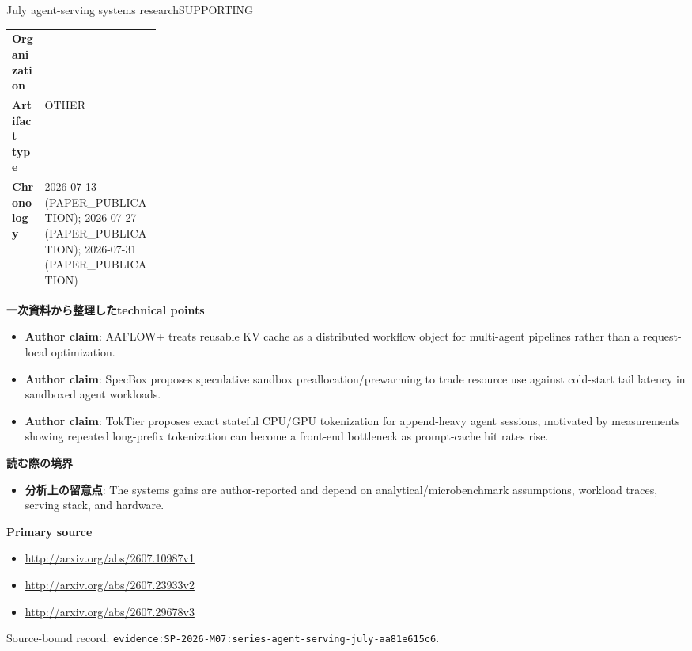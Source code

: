 \begin{technicalnote}{July agent-serving systems research}{SUPPORTING}
\begin{tabularx}{\linewidth}{@{}>{\bfseries}p{0.22\linewidth}X@{}}
Organization & - \\
Artifact type & OTHER \\
Chronology & 2026-07-13 (PAPER\_PUBLICATION); 2026-07-27 (PAPER\_PUBLICATION); 2026-07-31 (PAPER\_PUBLICATION) \\
\end{tabularx}
\smallskip
{\bfseries 一次資料から整理したtechnical points}
\begin{itemize}[leftmargin=1.5em,itemsep=0.35em]
\item \textbf{Author claim}: AAFLOW+ treats reusable KV cache as a distributed workflow object for multi-agent pipelines rather than a request-local optimization.
\item \textbf{Author claim}: SpecBox proposes speculative sandbox preallocation/prewarming to trade resource use against cold-start tail latency in sandboxed agent workloads.
\item \textbf{Author claim}: TokTier proposes exact stateful CPU/GPU tokenization for append-heavy agent sessions, motivated by measurements showing repeated long-prefix tokenization can become a front-end bottleneck as prompt-cache hit rates rise.
\end{itemize}
{\bfseries 読む際の境界}
\begin{itemize}[leftmargin=1.5em,itemsep=0.35em]
\item \textbf{分析上の留意点}: The systems gains are author-reported and depend on analytical/microbenchmark assumptions, workload traces, serving stack, and hardware.
\end{itemize}
{\bfseries Primary source}
\begin{itemize}[leftmargin=1.5em,itemsep=0.25em]
\item \url{http://arxiv.org/abs/2607.10987v1}
\item \url{http://arxiv.org/abs/2607.23933v2}
\item \url{http://arxiv.org/abs/2607.29678v3}
\end{itemize}
{\scriptsize\color{SurveyMuted}Source-bound record: \texttt{evidence:SP-2026-M07:series-agent-serving-july-aa81e615c6}.}
\end{technicalnote}
\medskip
